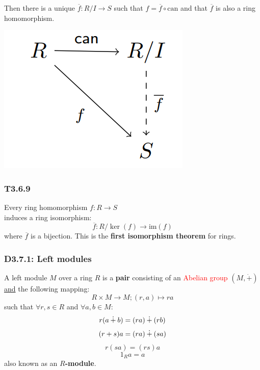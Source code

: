 \documentclass{article}
\begin{document}
\begin{multicols*}{3}
\begin{enumerate}
    Then there is
    a unique $\overline{f}:R/I\rightarrow S$
    such that $f=\overline{f}\circ\text{can}$ and that
    $\overline{f}$ is also a ring homomorphism.
\end{enumerate}
\begin{center}
    \includegraphics[scale=0.5]{f01.png}
\end{center}

\subsubsection*{T3.6.9}
Every ring homomorphism $f:R\rightarrow S$ \\
induces a ring isomorphism:
$$\overline{f}:R/\ker(f)\rightarrow\text{im}(f)$$
where $\overline{f}$ is a bijection. This is
the \textbf{first isomorphism theorem} for rings.

\subsubsection*{D3.7.1: Left modules}
A left module $M$ over a ring $R$ is a \textbf{pair} consisting
of an \textcolor{red}{Abelian group} $(M,\dot{+})$
\underline{and} the following mapping:
$$R\times M\rightarrow M;(r,a)\mapsto ra$$
such that $\forall r,s\in R$ and $\forall a,b\in M$:
$$r(a\hspace{0.03in}\dot{+}\hspace{0.03in}b)
=(ra)\hspace{0.03in}\dot{+}\hspace{0.03in}(rb)$$
$$(r+s)a=(ra)\hspace{0.03in}\dot{+}\hspace{0.03in}(sa)$$
$$r(sa)=(rs)a$$
$$1_R a=a$$
also known as an \textbf{$R$-module}.

\end{multicols*}
\end{document}
